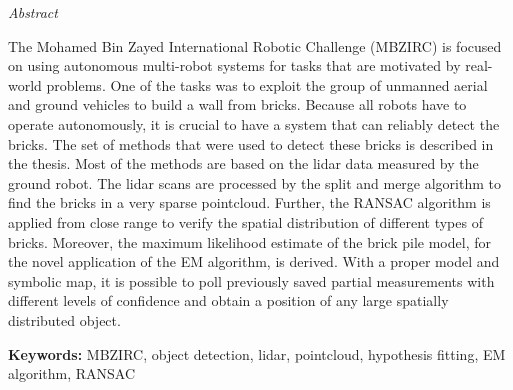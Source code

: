 \vfill
\begin{center}
{\it \large Abstract}
\vspace{0.2cm}

\begin{minipage}{0.8\textwidth}{
The Mohamed Bin Zayed International Robotic Challenge (MBZIRC) is focused on using autonomous multi-robot systems for tasks that are motivated by real-world problems. One of the tasks was to exploit the group of unmanned aerial and ground vehicles to build a wall from bricks. Because all robots have to operate autonomously, it is crucial to have a system that can reliably detect the bricks. The set of methods that were used to detect these bricks is described in the thesis. Most of the methods are based on the lidar data measured by the ground robot. The lidar scans are processed by the split and merge algorithm to find the bricks in a very sparse pointcloud. Further, the RANSAC algorithm is applied from close range to verify the spatial distribution of different types of bricks. Moreover, the maximum likelihood estimate of the brick pile model, for the novel application of the EM algorithm, is derived. With a proper model and symbolic map, it is possible to poll previously saved partial measurements with different levels of confidence and obtain a position of any large spatially distributed object.
\vspace{3mm}
\par \textbf{Keywords:} MBZIRC, object detection, lidar, pointcloud, hypothesis fitting, EM algorithm, RANSAC
}
\end{minipage}
\end{center}
\vfill
\vspace{1cm}
